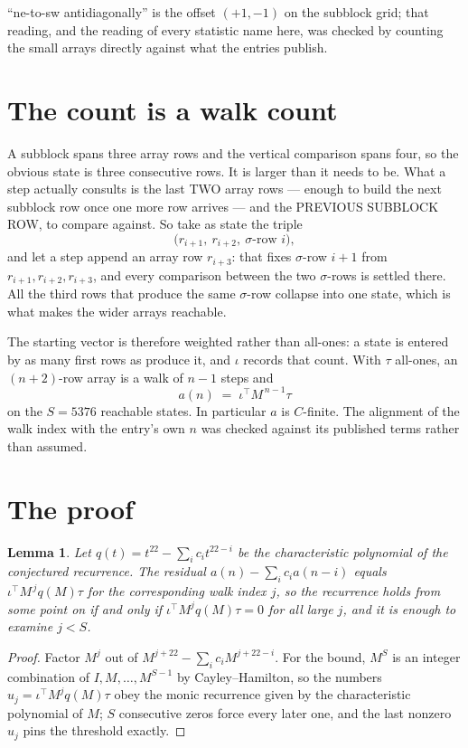 \documentclass[11pt,a4paper]{article}
\theoremstyle{plain}
\newtheorem{lemma}[theorem]{Lemma}
\theoremstyle{definition}
\begin{document}
``ne-to-sw antidiagonally'' is the offset $(+1,-1)$ on the subblock grid; that reading, and
the reading of every statistic name here, was checked by counting the small arrays directly
against what the entries publish.

\section{The count is a walk count}

A subblock spans three array rows and the vertical comparison spans four, so the obvious state
is three consecutive rows. It is larger than it needs to be. What a step actually consults is
the last TWO array rows --- enough to build the next subblock row once one more row arrives ---
and the PREVIOUS SUBBLOCK ROW, to compare against. So take as state the triple
\[
\bigl(r_{i+1},\ r_{i+2},\ \sigma\text{-row }i\bigr),
\]
and let a step append an array row $r_{i+3}$: that fixes $\sigma$-row $i+1$ from
$r_{i+1},r_{i+2},r_{i+3}$, and every comparison between the two $\sigma$-rows is settled
there. All the third rows that produce the same $\sigma$-row collapse into one state, which is
what makes the wider arrays reachable.

The starting vector is therefore weighted rather than all-ones: a state is entered by as many
first rows as produce it, and $\iota$ records that count. With $\tau$ all-ones, an
$(n+2)$-row array is a walk of $n-1$ steps and
\[
a(n)\;=\;\iota^{\!\top}M^{\,n-1}\tau
\]
on the $S=5376$ reachable states. In particular $a$ is $C$-finite. The alignment of the walk
index with the entry's own $n$ was checked against its published terms rather than assumed.

\section{The proof}

\begin{lemma}\label{lem:crit}
Let $q(t)=t^{22}-\sum_i c_it^{22-i}$ be the characteristic polynomial of the
conjectured recurrence. The residual $a(n)-\sum_ic_ia(n-i)$ equals
$\iota^{\!\top}M^{\,j}q(M)\tau$ for the corresponding walk index $j$, so the recurrence
holds from some point on if and only if $\iota^{\!\top}M^{j}q(M)\tau=0$ for all large $j$,
and it is enough to examine $j<S$.
\end{lemma}

\begin{proof}
Factor $M^{j}$ out of $M^{j+22}-\sum_ic_iM^{j+22-i}$. For the bound, $M^{S}$
is an integer combination of $I,M,\dots,M^{S-1}$ by Cayley--Hamilton, so the numbers
$u_j=\iota^{\!\top}M^{j}q(M)\tau$ obey the monic recurrence given by the characteristic
polynomial of $M$; $S$ consecutive zeros force every later one, and the last nonzero $u_j$
pins the threshold exactly.
\end{proof}
\end{document}
